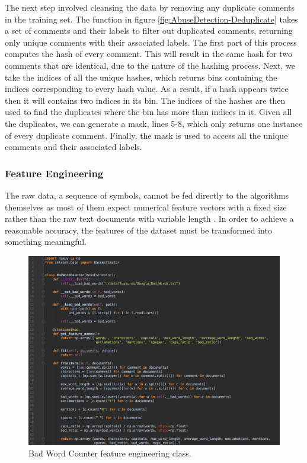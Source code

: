 The next step involved cleansing the data by removing any duplicate comments in the training set. The function in figure \ref{fig:AbuseDetection-Deduplicate} takes a set of comments and their labels to filter out duplicated comments, returning only unique comments with their associated labels. The first part of this process computes the hash of every comment. This will result in the same hash for two comments that are identical, due to the nature of the hashing process. Next, we take the indices of all the unique hashes, which returns bins containing the indices corresponding to every hash value. As a result, if a hash appears twice then it will contains two indices in its bin. The indices of the hashes are then used to find the duplicates where the bin has more than indices in it. Given all the duplicates, we can generate a mask, lines 5-8, which only returns one instance of every duplicate comment. Finally, the mask is used to access all the unique comments and their associated labels.

\subsubsection{Feature Engineering} \label{sec:feature-engineering}
The raw data, a sequence of symbols, cannot be fed directly to the algorithms themselves as most of them expect numerical feature vectors with a fixed size rather than the raw text documents with variable length \cite{scikit:tfidf}. In order to achieve a reasonable accuracy, the features of the dataset must be transformed into something meaningful.


\begin{figure}[H]
	\centering
	\includegraphics[width=\textwidth]{Images/Implementation/DataProcessing/AbuseDetection/BadWordCounter}
	\caption{Bad Word Counter feature engineering class.}
	\label{fig:AbuseDetection-BadWordCounter}
\end{figure}

